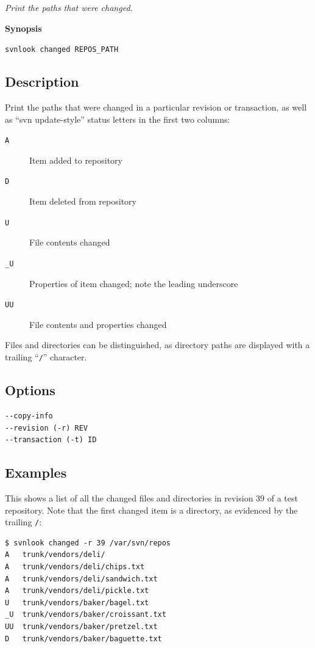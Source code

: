\emph{Print the paths that were changed.}

\textbf{Synopsis}

\texttt{svnlook\ changed\ REPOS\_PATH}

\subsection{Description}

Print the paths that were changed in a particular revision or
transaction, as well as ``svn update-style'' status letters in the first
two columns:

\begin{description}
\item[\texttt{\textquotesingle{}A\ \textquotesingle{}}]
Item added to repository
\item[\texttt{\textquotesingle{}D\ \textquotesingle{}}]
Item deleted from repository
\item[\texttt{\textquotesingle{}U\ \textquotesingle{}}]
File contents changed
\item[\texttt{\textquotesingle{}\_U\textquotesingle{}}]
Properties of item changed; note the leading underscore
\item[\texttt{\textquotesingle{}UU\textquotesingle{}}]
File contents and properties changed
\end{description}

Files and directories can be distinguished, as directory paths are
displayed with a trailing ``\texttt{/}'' character.

\subsection{Options}

\begin{verbatim}
--copy-info
--revision (-r) REV
--transaction (-t) ID
\end{verbatim}

\subsection{Examples}

This shows a list of all the changed files and directories in revision
39 of a test repository. Note that the first changed item is a
directory, as evidenced by the trailing \texttt{/}:

\begin{verbatim}
$ svnlook changed -r 39 /var/svn/repos
A   trunk/vendors/deli/
A   trunk/vendors/deli/chips.txt
A   trunk/vendors/deli/sandwich.txt
A   trunk/vendors/deli/pickle.txt
U   trunk/vendors/baker/bagel.txt
_U  trunk/vendors/baker/croissant.txt
UU  trunk/vendors/baker/pretzel.txt
D   trunk/vendors/baker/baguette.txt
\end{verbatim}

